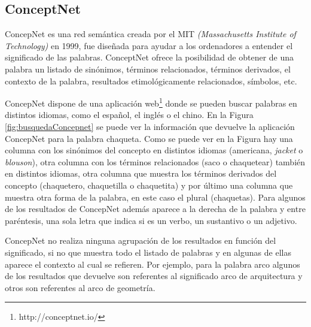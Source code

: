 \subsection{ConceptNet} 
\label{cap:subsec:concepnet}

ConcepNet es una red semántica creada por el MIT \textit{(Massachusetts Institute of Technology)} en 1999, fue diseñada para ayudar a los ordenadores a entender el significado de las palabras. ConceptNet ofrece la posibilidad de obtener de una palabra un listado de sinónimos, términos relacionados, términos derivados, el contexto de la palabra, resultados etimológicamente relacionados, símbolos, etc. 

ConcepNet dispone de una aplicación web\footnote{http://conceptnet.io/} donde se pueden buscar palabras en distintos idiomas,  como el español, el inglés o el chino.
En la Figura \ref{fig:busquedaConcepnet} se puede ver la información que devuelve la aplicación ConcepNet para la palabra chaqueta. Como se puede ver en la Figura hay una columna con los sinónimos del concepto  en distintos idiomas (americana, \textit{jacket} o \textit{blouson}), otra columna con los términos relacionados (saco o chaquetear) también en distintos idiomas, otra columna que muestra los términos derivados del concepto (chaquetero, chaquetilla o chaquetita) y por último una columna que muestra otra forma de la palabra, en este caso el plural (chaquetas).  Para algunos de los resultados de ConcepNet además aparece a la derecha de la palabra y entre paréntesis, una sola letra que indica si es un verbo, un sustantivo o un adjetivo. 

ConcepNet no realiza ninguna agrupación de los resultados en función del significado, si no que muestra todo el listado de palabras y en algunas de ellas aparece el contexto al cual se refieren. Por ejemplo, para la palabra arco algunos de los resultados que devuelve son referentes al significado arco de arquitectura y otros son referentes al arco de geometría.


